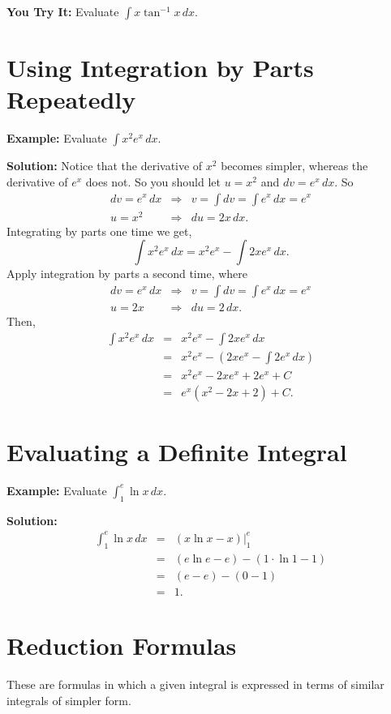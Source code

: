 \documentclass[titlepage,a4paper,12pt]{report}
\begin{document}
\noindent \textbf{You Try It:} Evaluate $\displaystyle \int x\tan ^{-1} x \, dx$.

\section{Using Integration by Parts Repeatedly}
\textbf{Example:} Evaluate $\displaystyle \int x^2e^x\, dx$.

\noindent \textbf{Solution:} Notice that the derivative of $x^2$ becomes simpler, whereas the derivative of $e^x$ does not. So you should let $u=x^2$ and $dv=e^x\, dx$. So 
\begin{eqnarray*}
dv=e^x\, dx  &\Rightarrow & v=\int dv=\int e^x\, dx =e^x\\
u=x^2 &\Rightarrow & du=2x\, dx.
\end{eqnarray*}
Integrating by parts one time we get, 
\begin{equation*}
\int x^2e^x\, dx =x^2e^x-\int 2xe^x\, dx.
\end{equation*}
Apply integration by parts a second time, where 
\begin{eqnarray*}
dv=e^x \, dx &\Rightarrow & v=\int dv =\int e^x \, dx =e^x\\
u=2x &\Rightarrow & du=2\, dx.
\end{eqnarray*}
Then, 
\begin{eqnarray*}
\int x^2e^x\, dx &=& x^2e^x-\int 2xe^x\, dx\\
&=& x^2e^x-\left(2xe^x-\int 2e^x\, dx\right)\\
&=& x^2e^x-2xe^x+2e^x+C\\
&=& e^x(x^2-2x+2)+C.
\end{eqnarray*}
\section{Evaluating a Definite Integral}
\textbf{Example:} Evaluate $\displaystyle \int _{1}^e \ln x \, dx$.

\noindent \textbf{Solution:} 
\begin{eqnarray*}
 \int _{1}^e \ln x \, dx &=& (x\ln x -x)\biggl |_{1}^e \\
 &=& (e\ln e -e)-(1\cdot \ln 1 -1)\\
 &=& (e-e)-(0-1)\\
 &=& 1.
\end{eqnarray*}
\section{Reduction Formulas}
These are formulas in which a given integral is expressed in terms of similar integrals of simpler form. 
\end{document}
